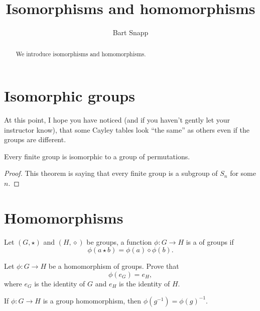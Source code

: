 \documentclass{ximera}
\author{Bart Snapp}
\title{Isomorphisms and homomorphisms}
\begin{document}
\begin{abstract}
  We introduce isomorphisms and homomorphisms.
\end{abstract}
\maketitle



\section{Isomorphic groups}

At this point, I hope you have noticed (and if you haven't gently let
your instructor know), that some Cayley tables look ``the same'' as
others even if the groups are different.



\begin{theorem}
  Every finite group is isomorphic to a group of permutations.
  \begin{proof}
    This theorem is saying that every finite group is a subgroup of
    $S_n$ for some $n$. 
  \end{proof}
\end{theorem}

\begin{corollary}
\end{corollary}


\section{Homomorphisms}

\begin{definition}
  Let $(G,\star)$ and $(H,\diamond)$ be groups, a function $\phi:G\to
  H$ is a  of groups if
  \[
  \phi(a\star b) = \phi(a)\diamond\phi(b).
  \]
\end{definition}

\begin{exercise}\label{L:HPId}
  Let $\phi:G\to H$ be a homomorphism of groups. Prove that
  \[
  \phi(e_G) = e_H,
  \]
  where $e_G$ is the identity of $G$ and $e_H$ is the identity of
  $H$.
\end{exercise}



\begin{lemma}\label{L:HPI}
  If $\phi:G\to H$ is a group homomorphism, then $\phi(g^{-1}) =
  \phi(g)^{-1}$.
\end{lemma}
\end{document}
